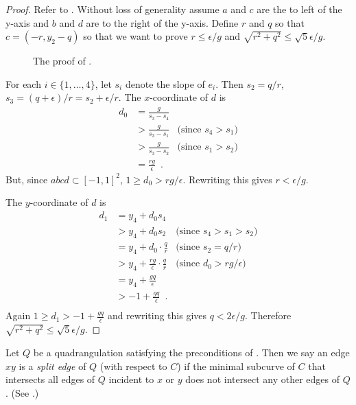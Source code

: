 \documentclass{patmorin}
\begin{document}
\begin{proof}
  Refer to .  Without loss of generality assume
  $a$ and $c$ are the to left of the y-axis and $b$ and $d$ are to
  the right of the y-axis.  Define $r$ and $q$ so that $c=(-r,y_2-q)$
  so that we want to prove $r\le\epsilon/g$ and $\sqrt{r^2+q^2}\le
  \sqrt{5}\epsilon/g$.

  \begin{figure}
     \caption{The proof of .}
  \end{figure}

  For each $i\in\{1,\ldots,4\}$, let $s_i$ denote the slope of $e_i$.
  Then $s_2=q/r$, $s_3=(q+\epsilon)/r=s_2+\epsilon/r$.
  The $x$-coordinate of $d$ is
  \begin{align*}
      d_0 & = \frac{g}{s_3-s_4} \\ 
          & > \frac{g}{s_3-s_1} & \text{(since $s_4 > s_1$)} \\
          & > \frac{g}{s_3-s_2} & \text{(since $s_1 > s_2$)}\\
          & = \frac{rg}{\epsilon} \enspace .
  \end{align*}
  But, since $abcd\subset[-1,1]^2$,  $1\ge d_0> rg/\epsilon$.
  Rewriting this gives $r < \epsilon/g$.

  The $y$-coordinate of $d$ is
  \begin{align*}
     d_1 & = y_4 + d_0 s_4 \\
     & > y_4 + d_0 s_2 & \text{(since $s_4>s_1>s_2$)} \\
     & = y_4 + d_0 \cdot\frac{q}{r} & \text{(since $s_2=q/r$)} \\
     & > y_4 + \frac{rg}{\epsilon}\cdot\frac{q}{r} & \text{(since $d_0>rg/\epsilon$)} \\
     & = y_4 + \frac{gq}{\epsilon} \\
     & > -1 + \frac{gq}{\epsilon} \enspace. \\
  \end{align*}
  Again $1\ge d_1 > -1 + \frac{gq}{\epsilon}$ and rewriting this gives
  $q < 2\epsilon/g$.  Therefore $\sqrt{r^2+q^2} \le \sqrt{5}\epsilon/g$.
\end{proof}

Let $Q$ be a quadrangulation satisfying the preconditions of
. Then we say an edge $xy$ is a \emph{split edge} of $Q$
(with respect to $C$) if the minimal subcurve of $C$ that intersects all
edges of $Q$ incident to $x$ or $y$ does not intersect any other edges
of $Q$. (See .)
\end{document}

